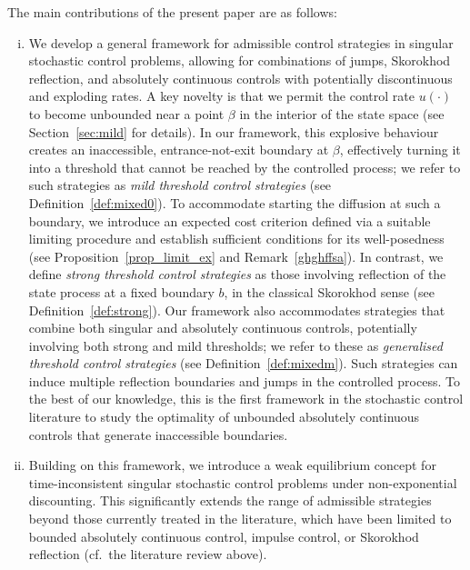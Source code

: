 \documentclass[11pt]{article} %
\numberwithin{komcounter}{section}
\begin{document}
The main contributions of the present paper are as follows: 
\begin{enumerate}[(i)]

\vspace{-1.5mm}
\item We develop a general framework for admissible control strategies in singular stochastic control problems, allowing for combinations of jumps, Skorokhod reflection, and absolutely continuous controls with potentially discontinuous and exploding rates. 
A key novelty is that we permit the control rate $u(\cdot)$ to become unbounded near a point $\beta$ in the interior of the state space (see Section~\ref{sec:mild} for details). 
In our framework, this explosive behaviour creates an inaccessible, entrance-not-exit boundary at $\beta$, effectively turning it into a threshold that cannot be reached by the controlled process; 
we refer to such strategies as {\it mild threshold control strategies} (see Definition~\ref{def:mixed0}). 
To accommodate starting the diffusion at such a boundary, we introduce an expected cost criterion defined via a suitable limiting procedure and establish sufficient conditions for its well-posedness (see Proposition~\ref{prop_limit_ex} and Remark~\ref{ghghffsa}).
In contrast, we define {\it strong threshold control strategies} as those involving reflection of the state process at a fixed boundary $b$, in the classical Skorokhod sense (see Definition~\ref{def:strong}). 
Our framework also accommodates strategies that combine both singular and absolutely continuous controls, potentially involving both strong and mild thresholds; we refer to these as {\it generalised threshold control strategies} (see Definition~\ref{def:mixedm}). 
Such strategies can induce multiple reflection boundaries and jumps in the controlled process. 
To the best of our knowledge, this is the first framework in the stochastic control literature to study the optimality of unbounded absolutely continuous controls that generate inaccessible boundaries.



\vspace{-2mm}
\item Building on this framework, we introduce a weak equilibrium concept for time-inconsistent singular stochastic control problems under non-exponential discounting. This significantly extends the range of admissible strategies beyond those currently treated in the literature, which have been limited to bounded absolutely continuous control, impulse control, or Skorokhod reflection (cf.~the literature review above). 



\end{enumerate}
\end{document}
